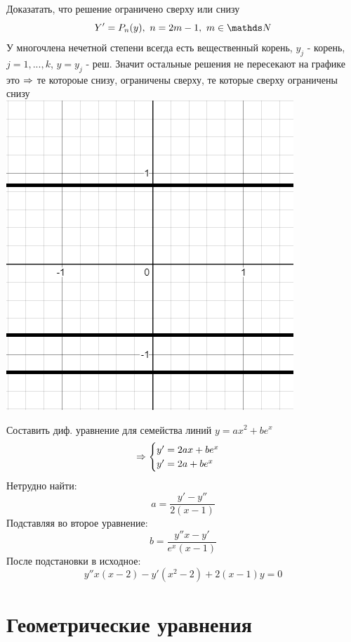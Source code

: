 \documentclass[12pt, fleqn]{article}
\begin{document}
    \begin{example}
        Доказатать, что решение ограничено сверху или снизу\\
        \[Y'=P_n(y),\ n=2m-1,\ m \in \N\]
        У многочлена нечетной степени всегда есть вещественный корень, $y_j$ - корень, $j=1,...,k$, $y=y_j$ - реш. Значит остальные решения не пересекают на графике это $\Rightarrow$ те котороые снизу, ограничены сверху, те которые сверху ограничены снизу\\
        \includegraphics[scale=0.3]{pics/resh2.png}
    \end{example}

    \begin{example}[24, дополнительно]
      Составить диф. уравнение для семейства линий $y=a x^2 + b e^x$
      \[\Rightarrow
      \begin{cases}
        y'=2a x + b e^x\\
        y'=2a + b e^x
      \end{cases}\]
      Нетрудно найти:
      \[a=\frac{y'-y''}{2(x-1)}\]
      Подставляя во второе уравнение:
      \[b=\frac{y'' x - y'}{e^x (x-1)}\]
      После подстановки в исходное:
      \[y'' x(x-2)-y'(x^2-2)+2(x-1)y=0\]
    \end{example}

    \section{Геометрические уравнения}
\end{document}
